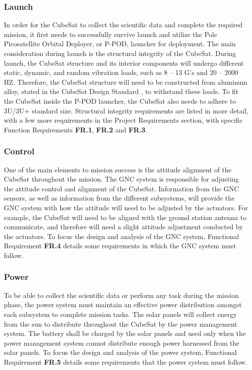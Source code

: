 \subsubsection{Launch}
In order for the CubeSat to collect the scientific data and complete the required mission, it first needs to successfully survive launch and utilize the Pole Picosatellite Orbital Deployer, or P-POD, launcher for deployment. The main consideration during launch is the structural integrity of the CubeSat. During launch, the CubeSat structure and its interior components will undergo different static, dynamic, and random vibration loads, such as 8 – 13 G’s and 20 – 2000 HZ. Therefore, the CubeSat structure will need to be constructed from aluminum alloy, stated in the CubeSat Design Standard \cite{CSS}, to withstand these loads. To fit the CubeSat inside the P-POD launcher, the CubeSat also needs to adhere to 3U/3U+ standard size. Structural integrity requirements are listed in more detail, with a few more requirements in the Project Requirements section, with specific Function Requirements \textbf{FR.1}, \textbf{FR.2} and \textbf{FR.3}. 
\subsubsection{Control}
One of the main elements to mission success is the attitude alignment of the CubeSat throughout the mission. The GNC system is responsible for adjusting the attitude control and alignment of the CubeSat.  Information from the GNC sensors, as well as information from the different subsystems, will provide the GNC system with how the attitude will need to be adjusted by the actuators. For example, the CubeSat will need to be aligned with the ground station antenna to communicate, and therefore will need a slight attitude adjustment conducted by the actuators. To focus the design and analysis of the GNC system, Functional Requirement \textbf{FR.4} details some requirements in which the GNC system must follow.
\subsubsection{Power}
To be able to collect the scientific data or perform any task during the mission phase, the power system must maintain an effective power distribution amongst each subsystem to complete mission tasks. The solar panels will collect energy from the sun to distribute throughout the CubeSat by the power management system. The battery shall be charged by the solar panels and used only when the power management system cannot distribute enough power harnessed from the solar panels. To focus the design and analysis of the power system, Functional Requirement \textbf{FR.5} details some requirements that the power system must follow. 
